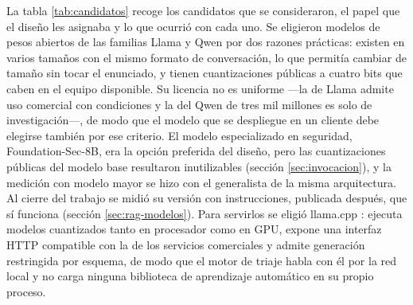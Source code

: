 La tabla \ref{tab:candidatos} recoge los candidatos que se consideraron, el papel que el diseño les
asignaba y lo que ocurrió con cada uno. Se eligieron modelos de pesos abiertos de las familias Llama
\cite{llama3} y Qwen \cite{qwen25} por dos razones prácticas: existen en varios tamaños con el mismo
formato de conversación, lo que permitía cambiar de tamaño sin tocar el enunciado, y tienen
cuantizaciones públicas a cuatro bits que caben en el equipo disponible. Su licencia no es
uniforme ---la de Llama admite uso comercial con condiciones y la del Qwen de tres mil millones es
solo de investigación---, de modo que el modelo que se despliegue en un cliente debe elegirse
también por ese criterio. El modelo especializado en seguridad, Foundation-Sec-8B, era la
opción preferida del diseño, pero las cuantizaciones públicas del modelo base resultaron
inutilizables (sección \ref{sec:invocacion}), y la medición con modelo mayor se hizo con el
generalista de la misma arquitectura. Al cierre del trabajo se midió su versión con instrucciones,
publicada después, que sí funciona (sección \ref{sec:rag-modelos}). Para servirlos se eligió llama.cpp \cite{llamacpp}: ejecuta modelos cuantizados tanto
en procesador como en GPU, expone una interfaz HTTP compatible con la de los servicios comerciales y
admite generación restringida por esquema, de modo que el motor de triaje habla con él por la red
local y no carga ninguna biblioteca de aprendizaje automático en su propio proceso.

